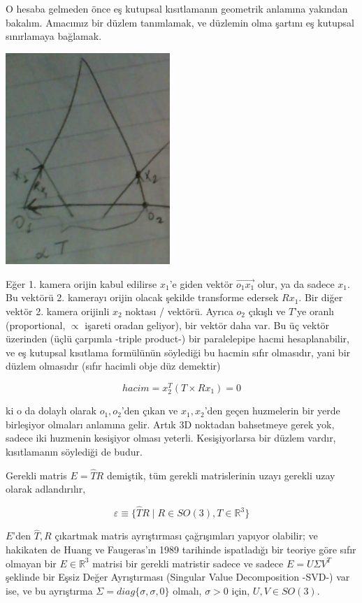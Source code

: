 \documentclass[12pt,fleqn]{article}\usepackage{../../common}
\begin{document}
O hesaba gelmeden önce eş kutupsal kısıtlamanın geometrik anlamına yakından
bakalım. Amacımız bir düzlem tanımlamak, ve düzlemin olma şartını eş kutupsal
sınırlamaya bağlamak.

\includegraphics[height=8cm]{epi3.png}

Eğer 1. kamera orijin kabul edilirse $x_1$'e giden vektör $\vec{o_1x_1}$ olur,
ya da sadece $x_1$. Bu vektörü 2. kamerayı orijin olacak şekilde transforme
edersek $Rx_1$. Bir diğer vektör 2. kamera orijinli $x_2$ noktası /
vektörü. Ayrıca $o_2$ çıkışlı ve $T$'ye oranlı (proportional, $\propto$ işareti
oradan geliyor), bir vektör daha var. Bu üç vektör üzerinden (üçlü çarpımla
-triple product-) bir paralelepipe hacmi hesaplanabilir, ve eş kutupsal
kısıtlama formülünün söylediği bu hacmin sıfır olmasıdır, yani bir düzlem
olmasıdır (sıfır hacimli obje düz demektir)

$$ hacim = x_2^T (T \times Rx_1) = 0 $$

ki o da dolaylı olarak $o_1,o_2$'den çıkan ve $x_1,x_2$'den geçen huzmelerin bir
yerde birleşiyor olmaları anlamına gelir. Artık 3D noktadan bahsetmeye gerek
yok, sadece iki huzmenin kesişiyor olması yeterli. Kesişiyorlarsa bir düzlem
vardır, kısıtlamanın söylediği de budur.

Gerekli matris $E = \hat{T}R$ demiştik, tüm gerekli matrislerinin uzayı gerekli
uzay olarak adlandırılır,

$$ \varepsilon \equiv \bigg\{ 
\hat{T}R \mid R \in SO(3), T \in \mathbb{R}^3
\bigg\}
$$

$E$'den $\hat{T},R$ çıkartmak matris ayrıştırması çağrışımları yapıyor olabilir;
ve hakikaten de Huang ve Faugeras'ın 1989 tarihinde ispatladığı bir teoriye göre
sıfır olmayan bir $E \in \mathbb{R}^3$ matrisi bir gerekli matristir sadece ve
sadece $E = U \Sigma V^T$ şeklinde bir Eşsiz Değer Ayrıştırması (Singular Value
Decomposition -SVD-) var ise, ve bu ayrıştırma $\Sigma =
diag\{\sigma,\sigma,0\}$ olmalı, $\sigma > 0$ için, $U,V \in SO(3)$.
\end{document}

